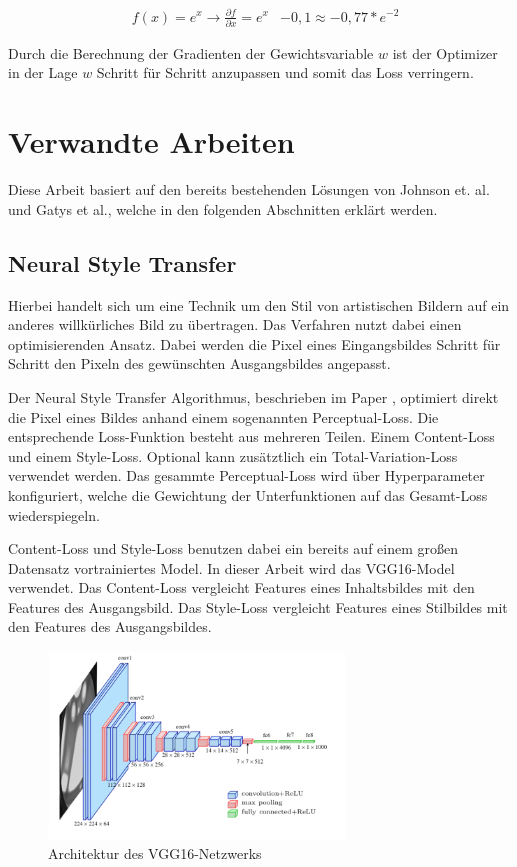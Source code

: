 \begin{align}
	& f(x) = e^{x} \rightarrow \frac{\partial f}{\partial x} = e^{x}
	& -0,1 \approx -0,77 * e^{-2}
\end{align}

Durch die Berechnung der Gradienten der Gewichtsvariable $ w $ ist der Optimizer in der Lage $ w $ Schritt für Schritt anzupassen und somit das Loss verringern.

\pagebreak

\section{Verwandte Arbeiten}

Diese Arbeit basiert auf den bereits bestehenden Lösungen von Johnson et. al. und Gatys et al., welche in den folgenden Abschnitten erklärt werden.

\subsection{Neural Style Transfer}
\label{sec:neural_style_transfer}

Hierbei handelt sich um eine Technik um den Stil von artistischen Bildern auf ein anderes willkürliches Bild zu übertragen.
Das Verfahren nutzt dabei einen optimisierenden Ansatz. Dabei werden die Pixel eines Eingangsbildes Schritt für Schritt den Pixeln 
des gewünschten Ausgangsbildes angepasst. 

Der Neural Style Transfer Algorithmus, beschrieben im Paper \cite{DBLP:journals/corr/GatysEB15a}, optimiert direkt die Pixel eines Bildes anhand einem sogenannten Perceptual-Loss. Die entsprechende Loss-Funktion besteht aus mehreren Teilen. Einem Content-Loss und einem Style-Loss. Optional kann zusätztlich ein Total-Variation-Loss verwendet werden. Das gesammte Perceptual-Loss wird über Hyperparameter konfiguriert, welche die Gewichtung der Unterfunktionen auf das Gesamt-Loss wiederspiegeln.

Content-Loss und Style-Loss benutzen dabei ein bereits auf einem großen Datensatz vortrainiertes Model. In dieser Arbeit wird das VGG16-Model \cite{DBLP:journals/corr/SimonyanZ14a} verwendet. Das Content-Loss vergleicht Features eines Inhaltsbildes mit den Features des Ausgangsbild. Das Style-Loss vergleicht Features eines Stilbildes mit den Features des Ausgangsbildes.

\begin{figure}[H]
	\centering
	\includegraphics[width=0.70\textwidth]{resources/content/vgg16.png}
	\caption{Architektur des VGG16-Netzwerks \cite{vgg16_img}}
	\label{img:vgg16_img}
\end{figure}

